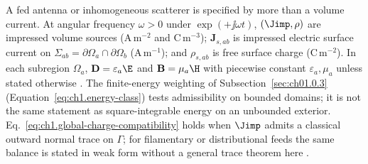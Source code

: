 A fed antenna or inhomogeneous scatterer is specified by more than a volume current. At angular frequency $\omega>0$ under $\exp(+\jj\omega t)$, $(\Jimp,\rho)$ are impressed volume sources (A\,m$^{-2}$ and C\,m$^{-3}$); $\mathbf{J}_{s,ab}$ is impressed electric surface current on $\Sigma_{ab}=\partial\Omega_a\cap\partial\Omega_b$ (A\,m$^{-1}$); and $\rho_{s,ab}$ is free surface charge (C\,m$^{-2}$). In each subregion $\Omega_a$, $\mathbf{D}=\varepsilon_a\E$ and $\mathbf{B}=\mu_a\H$ with piecewise constant $\varepsilon_a,\mu_a$ unless stated otherwise \cite{stratton1941}. The finite-energy weighting of Subsection~\ref{sec:ch01.0.3} (Equation~\eqref{eq:ch1.energy-class}) tests admissibility on bounded domains; it is not the same statement as square-integrable energy on an unbounded exterior. Eq.~\eqref{eq:ch1.global-charge-compatibility} holds when $\Jimp$ admits a classical outward normal trace on $\Gamma$; for filamentary or distributional feeds the same balance is stated in weak form without a general trace theorem here \cite{stratton1941}.


